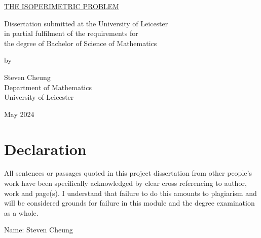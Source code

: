 \documentclass[a4paper]{book}
\numberwithin{theorem}{section}%
\begin{document}
\begin{titlepage}\phantom{|}\vspace{0.75in}
\begin{center}
    \underline{THE ISOPERIMETRIC PROBLEM}
\end{center}
\begin{center}
    \underline{}
\end{center}
\vspace{1.5in}%
\begin{center}
    Dissertation submitted at the University of Leicester \\
    in partial fulfilment of the requirements for \\ 
    the degree of Bachelor of Science of Mathematics\\
\end{center}
\vspace{.5in}
\begin{center}
    by
\end{center}
\vspace{.5in}
\begin{center}
    Steven Cheung \\
    Department of Mathematics \\
    University of Leicester \\
\end{center}
\vspace{0.5in}
\begin{center}
    May 2024
\end{center}
\end{titlepage}


\renewcommand{\bibname}{References}

\tableofcontents
\thispagestyle{empty}
\chapter*{Declaration}                %
All sentences or passages quoted in this project dissertation from other
people's work have been specifically acknowledged by clear cross referencing
to author, work and page(s). I understand that failure to do this amounts
to plagiarism and will be considered grounds for failure in this module and
the degree examination as a whole.


\bigskip

\noindent
Name: Steven Cheung
\end{document}
